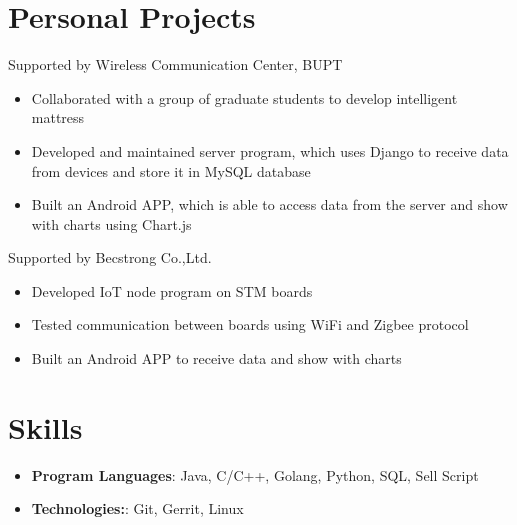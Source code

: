 \documentclass{resume}
\begin{document}
\section{Personal Projects}
Supported by Wireless Communication Center, BUPT
\begin{itemize}[parsep=0.25ex]
    \item Collaborated with a group of graduate students to develop intelligent mattress
    \item Developed and maintained server program, which uses Django to receive data from devices and store it in MySQL database
    \item Built an Android APP, which is able to access data from the server and show with charts using Chart.js
\end{itemize}
Supported by Becstrong Co.,Ltd.
\begin{itemize}[parsep=0.25ex]
    \item Developed IoT node program on STM boards
    \item Tested communication between boards using WiFi and Zigbee protocol
    \item Built an Android APP to receive data and show with charts
\end{itemize}

\section{Skills}
\begin{itemize}[parsep=0.25ex]
    \item
          \textbf{Program Languages}:
          Java, C/C++, Golang, Python, SQL, Sell Script
    \item
          \textbf{Technologies:}:
          Git, Gerrit, Linux
\end{itemize}
\end{document}
